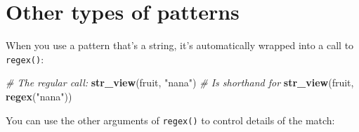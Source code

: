 \documentclass[]{book}
\newenvironment{Shaded}{\begin{snugshade}}{\end{snugshade}}
\newcommand{\KeywordTok}[1]{\textcolor[rgb]{0.13,0.29,0.53}{\textbf{#1}}}
\newcommand{\StringTok}[1]{\textcolor[rgb]{0.31,0.60,0.02}{#1}}
\newcommand{\CommentTok}[1]{\textcolor[rgb]{0.56,0.35,0.01}{\textit{#1}}}
\newcommand{\NormalTok}[1]{#1}
\begin{document}
\section{Other types of patterns}\label{other-types-of-patterns}

When you use a pattern that's a string, it's automatically wrapped into
a call to \texttt{regex()}:

\begin{Shaded}
\begin{Highlighting}[]
\CommentTok{# The regular call:}
\KeywordTok{str_view}\NormalTok{(fruit, }\StringTok{"nana"}\NormalTok{)}
\CommentTok{# Is shorthand for}
\KeywordTok{str_view}\NormalTok{(fruit, }\KeywordTok{regex}\NormalTok{(}\StringTok{"nana"}\NormalTok{))}
\end{Highlighting}
\end{Shaded}

You can use the other arguments of \texttt{regex()} to control details
of the match:
\end{document}
